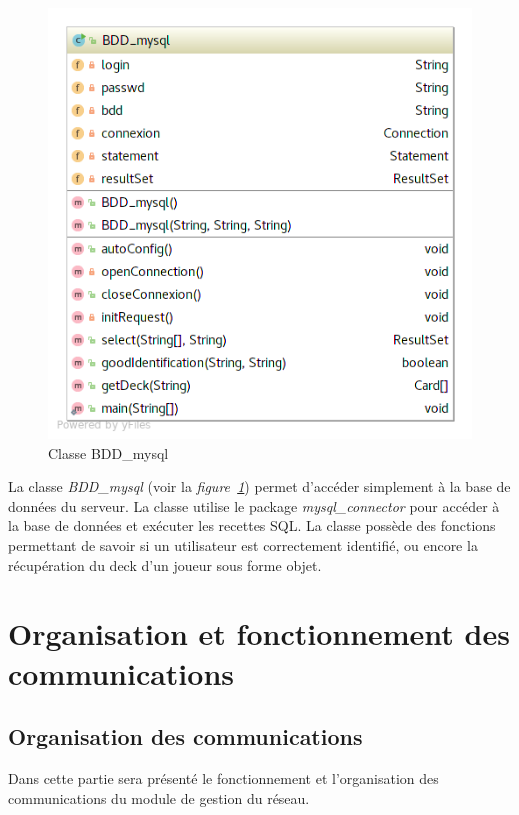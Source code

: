 \documentclass[a4paper, titlepage]{livret}
\begin{document}
  \begin{figure}[th]
      \begin{center}
        \includegraphics[scale=0.3]{Assets/UML_BDD.png}
        \caption{Classe BDD\_mysql}
        \label{Classe BDD_mysql}
      \end{center}
    \end{figure}
    
    La classe \textit{BDD\_mysql} (voir la \textit{figure~\ref{Classe BDD_mysql}}) permet d’accéder simplement à la base de données du serveur. La classe utilise le package \textit{mysql\_connector} pour accéder à la base de données et exécuter les recettes SQL. La classe possède des fonctions permettant de savoir si un utilisateur est correctement identifié, ou encore la récupération du deck d’un joueur sous forme objet.




\section{Organisation et fonctionnement des communications}

\subsection{Organisation des communications}
Dans cette partie sera présenté le fonctionnement et l’organisation des communications du module de gestion du réseau.
\end{document}
